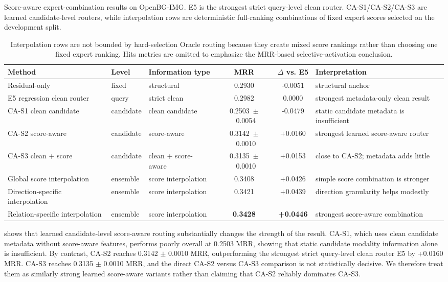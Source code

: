 \documentclass[11pt]{article}
\begin{document}
\begin{table}[t]
\centering
\scriptsize
\caption{Score-aware expert-combination results on OpenBG-IMG. E5 is the strongest strict query-level clean router. CA-S1/CA-S2/CA-S3 are learned candidate-level routers, while interpolation rows are deterministic full-ranking combinations of fixed expert scores selected on the development split.}
\label{tab:candidate_router_main_results}
\setlength{\tabcolsep}{3pt}
\begin{tabular}{p{}p{}p{}ccp{}}
\toprule
Method & Level & Information type & MRR & $\Delta$ vs. E5 & Interpretation \\
\midrule
Residual-only & fixed & structural & 0.2930 & -0.0051 & structural anchor \\
E5 regression clean router & query & strict clean & 0.2982 & 0.0000 & strongest metadata-only clean result \\
CA-S1 clean candidate & candidate & clean candidate & \mbox{0.2503 $\pm$ 0.0054} & -0.0479 & static candidate metadata is insufficient \\
CA-S2 score-aware & candidate & score-aware & \mbox{0.3142 $\pm$ 0.0010} & +0.0160 & strongest learned score-aware router \\
CA-S3 clean + score & candidate & clean + score-aware & \mbox{0.3135 $\pm$ 0.0010} & +0.0153 & close to CA-S2; metadata adds little \\
Global score interpolation & ensemble & score interpolation & 0.3408 & +0.0426 & simple score combination is stronger \\
Direction-specific interpolation & ensemble & score interpolation & 0.3421 & +0.0439 & direction granularity helps modestly \\
Relation-specific interpolation & ensemble & score interpolation & \textbf{0.3428} & \textbf{+0.0446} & strongest score-aware combination \\
\bottomrule
\end{tabular}
\vspace{0.4ex}\caption*{\footnotesize Interpolation rows are not bounded by hard-selection Oracle routing because they create mixed score rankings rather than choosing one fixed expert ranking. Hits metrics are omitted to emphasize the MRR-based selective-activation conclusion.}
\end{table}

 shows that learned candidate-level score-aware routing substantially changes the strength of the result. CA-S1, which uses clean candidate metadata without score-aware features, performs poorly overall at 0.2503 MRR, showing that static candidate modality information alone is insufficient. By contrast, CA-S2 reaches 0.3142 $\pm$ 0.0010 MRR, outperforming the strongest strict query-level clean router E5 by +0.0160 MRR. CA-S3 reaches 0.3135 $\pm$ 0.0010 MRR, and the direct CA-S2 versus CA-S3 comparison is not statistically decisive. We therefore treat them as similarly strong learned score-aware variants rather than claiming that CA-S2 reliably dominates CA-S3.
\end{document}

